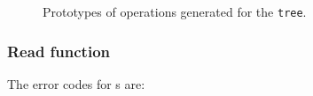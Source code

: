 \begin{figure}
















\caption{Prototypes of operations generated for
  the \Precur{} \texttt{tree}.}
\label{figure:recur-ops}
\end{figure}


\subsubsection{Read function}
The error codes for \Precur{}s are:

